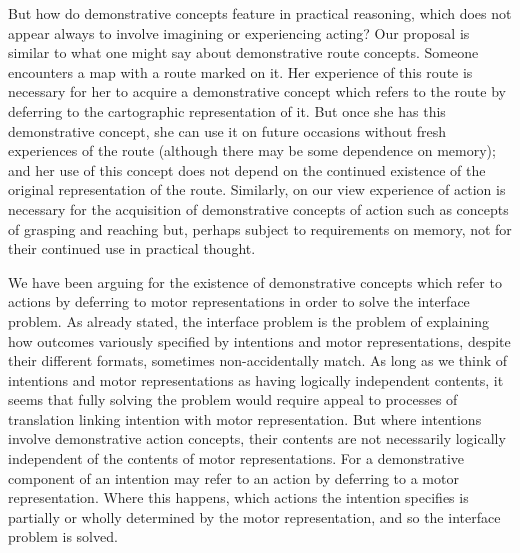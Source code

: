 \documentclass[12pt,\papersize]{extarticle}
\begin{document}
But how do demonstrative concepts feature in practical reasoning, which does not appear always to involve imagining or experiencing acting?  Our proposal is similar to what one might say about demonstrative route concepts.  Someone encounters a map with a route marked on it.  Her experience of this route is necessary for her to acquire a demonstrative concept which refers to the route by deferring to the cartographic representation of it.  But once she has this demonstrative concept, she can use it on future occasions without fresh experiences of the route (although there may be some dependence on memory); and her use of this concept does not depend on the continued existence of the original representation of the route.  Similarly, on our view experience of action is necessary for the acquisition of demonstrative concepts of action such as concepts of grasping and reaching but, perhaps subject to requirements on memory, not for their continued use in practical thought. 

We have been arguing for the existence of demonstrative concepts which refer to actions by deferring to motor representations in order to solve the interface problem. As already stated, the interface problem is the problem of explaining how outcomes variously specified by intentions and motor representations, despite their different formats, sometimes non-accidentally match. As long as we think of intentions and motor representations as having logically independent contents, it seems that fully solving the problem would require appeal to processes of translation linking intention with motor representation. But where intentions involve demonstrative action concepts, their contents are not necessarily logically independent of the contents of motor representations. For a demonstrative component of an intention may refer to an action by deferring to a motor representation. Where this happens, which actions the intention specifies is partially or wholly determined by the motor representation, and so the interface problem is solved.
\end{document}
